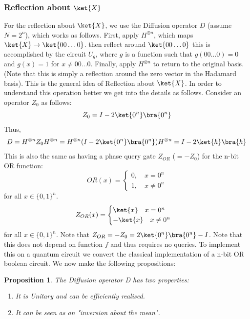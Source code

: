 \documentclass[12pt, oneside]{book}
\newtheorem{proposition}[theorem]{Proposition}
\theoremstyle{definition}
\theoremstyle{definition}
\theoremstyle{remark}
\begin{document}
\subsubsection{Reflection about $\ket{X}$}
For the reflection about $\ket{X}$, we use the 
Diffusion operator $D$ (assume $N=2^n$), 
which works as follows. 
First, apply $H^{\otimes n}$, which maps 
$\ket{X}\rightarrow \ket{00\ldots 0}$. 
then reflect around $\ket{00\ldots 0}$ this 
is accomplished by the circuit $U_g$, where $g$ 
is a function such that $g(00\ldots 0)=0$ and $g(x)=1$ 
for $x \neq 00\ldots 0$. Finally, apply $H^{\otimes n}$ 
to return to the original basis. (Note that this is simply 
a reflection around the zero vector in the Hadamard basis). 
This is the general idea of Reflection about $\ket{X}$. 
In order to understand this operation better we get into 
the details as follows.
Consider an operator $Z_0$ as follows:
\[
Z_0=I-2\ket{0^n}\bra{0^n}
\]
Thus,
\[
D=H^{\otimes n}Z_0H^{\otimes n}=H^{\otimes n}(I-2\ket{0^n}\bra{0^n})H^{\otimes n}=I-2\ket{h}\bra{h}
\]
This is also the same as having a phase query gate $Z_{OR}$ ($=-Z_0$) for the n-bit OR function:
\[
OR(x)=\begin{cases}
    0, \quad x=0^n \\ 1, \quad x\neq0^n
\end{cases}
\]
for all $x \in \{0,1\}^n$.
\[
Z_{OR}(x)=\begin{cases}
    \ket{x} \quad x=0^n \\
    -\ket{x} \quad x\neq0^n
\end{cases}
\]
for all $x \in \{0,1\}^n$. Note that $Z_{OR}=-Z_0=2\ket{0^n}\bra{0^n}-I$. Note that this does not depend on function $f$ and thus requires no queries. To implement this on a quantum circuit we convert the classical implementation of a n-bit OR boolean circuit.
We now make the following propositions:
\begin{proposition}
    The Diffusion operator D has two properties:
    \begin{enumerate}
        \item It is Unitary and can be efficiently realised.
        \item It can be seen as an "inversion about the mean".
    \end{enumerate}
\end{proposition}
\end{document}
